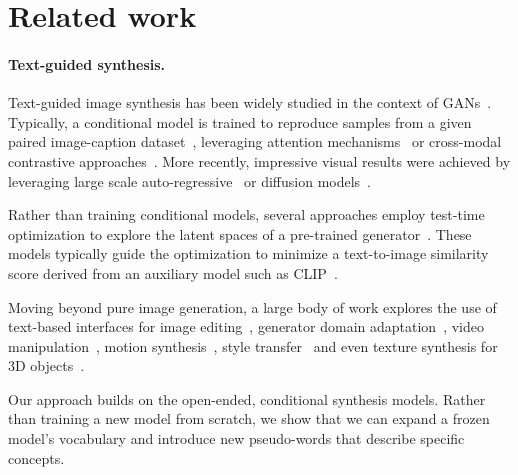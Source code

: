 \section{Related work}

\paragraph{Text-guided synthesis.}

Text-guided image synthesis has been widely studied in the context of GANs~\citep{goodfellow2014generative}. Typically, a conditional model is trained to reproduce samples from a given paired image-caption dataset~\citep{zhu2019dm,tao2020df}, leveraging attention mechanisms~\citep{xu2018attngan} or cross-modal contrastive approaches~\citep{zhang2021cross,ye2021improving}. More recently, impressive visual results were achieved by leveraging large scale auto-regressive~\citep{ramesh2021zero,yu2022scaling} or diffusion models~\citep{ramesh2022hierarchical,saharia2022photorealistic,nichol2021glide,rombach2021highresolution}.

Rather than training conditional models, several approaches employ test-time optimization to explore the latent spaces of a pre-trained generator~\citep{crowson2022vqgan,murdock2021bigsleep,crowson2021diffusion}. These models typically guide the optimization to minimize a text-to-image similarity score derived from an auxiliary model such as CLIP~\citep{radford2021learning}.

Moving beyond pure image generation, a large body of work explores the use of text-based interfaces for image editing~\citep{patashnik2021styleclip,abdal2021clip2stylegan,avrahami2022blended}, generator domain adaptation~\citep{gal2021stylegan,kim2022diffusionclip}, video manipulation~\citep{tzaban2022stitch,bar2022text2live}, motion synthesis~\citep{tevet2022motionclip,petrovich22temos}, style transfer~\citep{kwon2021clipstyler,liu2022name} and even texture synthesis for 3D objects~\citep{text2mesh}.

Our approach builds on the open-ended, conditional synthesis models. Rather than training a new model from scratch, we show that we can expand a frozen model's vocabulary and introduce new pseudo-words that describe specific concepts. 

